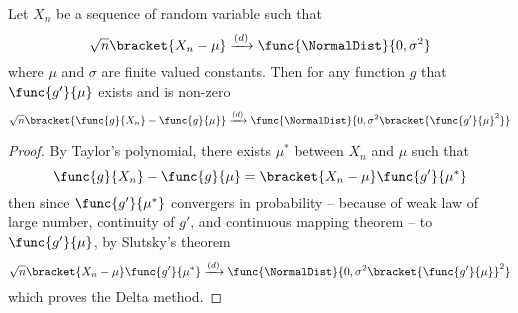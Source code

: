 \begin{theorem}
    Let \(X_n\) be a sequence of random variable such that 
    \begin{equation*}
        \sqrt{n} \bracket{X_n - \mu} \xrightarrow{(d)} \func{\NormalDist}{0,\sigma^2}
    \end{equation*}
    where \(\mu\) and \(\sigma\) are finite valued constants. Then for any function \(g\) that \(\func{g'}{\mu}\) exists and is non-zero 
    \begin{equation*}
        \sqrt{n} \bracket{\func{g}{X_n} - \func{g}{\mu}} \xrightarrow{(d)} \func{\NormalDist}{0,\sigma^2 \bracket{\func{g'}{\mu}^2}}
    \end{equation*}
\end{theorem}
\begin{proof}
    By Taylor's polynomial, there exists \(\mu^{\ast}\) between \(X_n\) and \(\mu\) such that 
    \begin{equation*}
        \func{g}{X_n} - \func{g}{\mu} = \bracket{X_n - \mu} \func{g'}{\mu^{\ast}}
    \end{equation*}
    then since \(\func{g'}{\mu^{\ast}}\) convergers in probability -- because of weak law of large number, continuity of \(g'\), and continuous mapping theorem -- to \(\func{g'}{\mu}\), by Slutsky's theorem 
    \begin{equation*}
        \sqrt{n}\bracket{X_n - \mu} \func{g'}{\mu^{\ast}} \xrightarrow{(d)} \func{\NormalDist}{0,\sigma^2 \bracket{\func{g'}{\mu}}^2}
    \end{equation*}
    which proves the Delta method.
\end{proof}